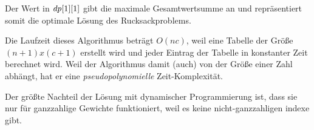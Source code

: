 \noindent Der Wert in $\mathit{dp}[1][1]$ gibt die maximale Gesamtwertsumme an und 
repräsentiert somit die optimale Lösung des Rucksackproblems.

Die Laufzeit dieses Algorithmus beträgt $O(nc)$, weil 
eine Tabelle der Größe $(n+1) x (c+1)$ erstellt wird und 
jeder Eintrag der Tabelle in konstanter Zeit berechnet wird.
Weil der Algorithmus damit (auch) von der Größe einer Zahl abhängt, 
hat er eine \textit{pseudopolynomielle} Zeit-Komplexität.

Der größte Nachteil der Lösung mit dynamischer Programmierung ist, dass 
sie nur für ganzzahlige Gewichte funktioniert, weil es keine nicht-ganzzahligen 
indexe gibt.\ \cite[vgl.][]{Martello1987}